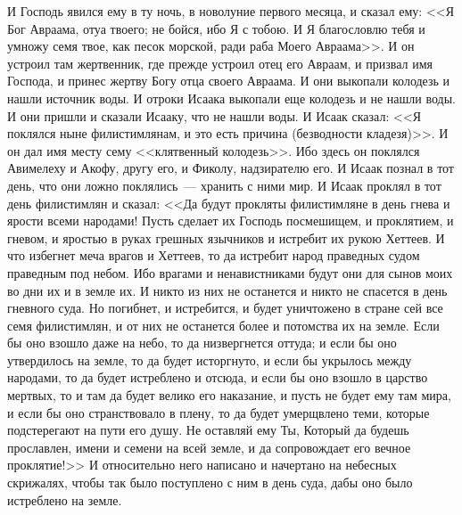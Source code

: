 И Господь явился ему в ту ночь, в новолуние
первого месяца, и сказал ему: <<Я Бог Авраама,
отуа твоего; не бойся, ибо Я с тобою. И Я
благословлю тебя и умножу семя твое, как песок
морской, ради раба Моего Авраама>>. И он устроил
там жертвенник, где прежде устроил отец его
Авраам, и призвал имя Господа, и принес жертву
Богу отца своего Авраама. И они выкопали колодезь
и нашли источник воды. И отроки Исаака выкопали
еще колодезь и не нашли воды. И они пришли и
сказали Исааку, что не нашли воды. И Исаак сказал:
<<Я поклялся ныне филистимлянам, и это есть
причина (безводности кладезя)>>. И он дал имя
месту сему <<клятвенный колодезь>>. Ибо здесь
он поклялся Авимелеху и Акофу, другу его, и
Фиколу, надзирателю его. И Исаак познал в тот
день, что они ложно поклялись~--- хранить с ними мир.
И Исаак проклял в тот день филистимлян и сказал:
<<Да будут прокляты филистимляне в день гнева и
ярости всеми народами! Пусть сделает их Господь
посмешищем, и проклятием, и гневом, и яростью в
руках грешных язычников и истребит их рукою
Хеттеев. И что избегнет меча врагов и Хеттеев, то
да истребит народ праведных судом праведным под
небом. Ибо врагами и ненавистниками будут они для
сынов моих во дни их и в земле их. И никто из
них не останется и никто не спасется в день
гневного суда. Но погибнет, и истребится, и будет
уничтожено в стране сей все семя филистимлян, и
от них не останется более и потомства их на земле.
Если бы оно взошло даже на небо, то да
низвергнется оттуда; и если бы оно утвердилось на
земле, то да будет исторгнуто, и если бы укрылось
между народами, то да будет истреблено и отсюда, и
если бы оно взошло в царство мертвых, то и там да
будет велико его наказание, и пусть не будет ему
там мира, и если бы оно странствовало в плену, то
да будет умерщвлено теми, которые подстерегают
на пути его душу. Не оставляй ему Ты, Который да
будешь прославлен, имени и семени на всей земле, и
да сопровождает его вечное проклятие!>> И
относительно него написано и начертано на
небесных скрижалях, чтобы так было поступлено с
ним в день суда, дабы оно было истреблено на
земле.

